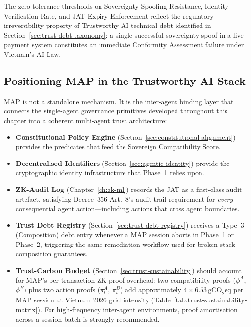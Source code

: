 The zero-tolerance thresholds on Sovereignty Spoofing Resistance,
Identity Verification Rate, and JAT Expiry Enforcement reflect the
regulatory irreversibility property of Trustworthy AI technical debt
identified in Section~\ref{sec:trust-debt-taxonomy}: a single successful
sovereignty spoof in a live payment system constitutes an immediate
Conformity Assessment failure under Vietnam's AI Law.

\subsection{Positioning MAP in the Trustworthy AI Stack}

MAP is not a standalone mechanism.  It is the inter-agent binding layer
that connects the single-agent governance primitives developed throughout
this chapter into a coherent multi-agent trust architecture:

\begin{itemize}
  \item \textbf{Constitutional Policy Engine}
        (Section~\ref{sec:constitutional-alignment}) provides the
        predicates that feed the Sovereign Compatibility Score.

  \item \textbf{Decentralised Identifiers}
        (Section~\ref{sec:agentic-identity}) provide the cryptographic
        identity infrastructure that Phase~1 relies upon.

  \item \textbf{ZK-Audit Log} (Chapter~\ref{ch:zk-ml}) records the
        JAT as a first-class audit artefact, satisfying Decree~356
        Art.~8's audit-trail requirement for \emph{every} consequential
        agent action---including actions that cross agent boundaries.

  \item \textbf{Trust Debt Registry}
        (Section~\ref{sec:trust-debt-registry}) receives a Type~3
        (Composition) debt entry whenever a MAP session aborts in
        Phase~1 or Phase~2, triggering the same remediation workflow
        used for broken stack composition guarantees.

  \item \textbf{Trust-Carbon Budget}
        (Section~\ref{sec:trust-sustainability}) should account for
        MAP's per-transaction ZK-proof overhead: two compatibility
        proofs ($\phi^A$, $\phi^B$) plus two action proofs
        ($\pi^A_t$, $\pi^B_t$) add approximately
        $4 \times 6.53\,\text{gCO}_2\text{eq}$ per MAP session at
        Vietnam 2026 grid intensity (Table~\ref{tab:trust-sustainability-matrix}).
        For high-frequency inter-agent environments, proof amortisation
        across a session batch is strongly recommended.
\end{itemize}

